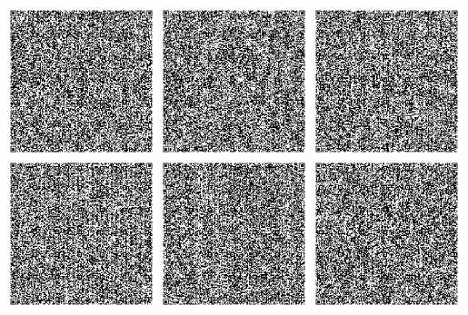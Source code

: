 \documentclass[twocolumn]{article}
\newcommand{\startsquarepar}{%
    \par\begingroup \parfillskip 0pt \relax}
\begin{document}
\startsquarepar
\noindent
\includegraphics[height=1.7in]{q01}
\includegraphics[height=1.7in]{q02}
\includegraphics[height=1.7in]{q03}
\includegraphics[height=1.7in]{q04}
\includegraphics[height=1.7in]{q05}
\includegraphics[height=1.7in]{q06}
\end{document}
